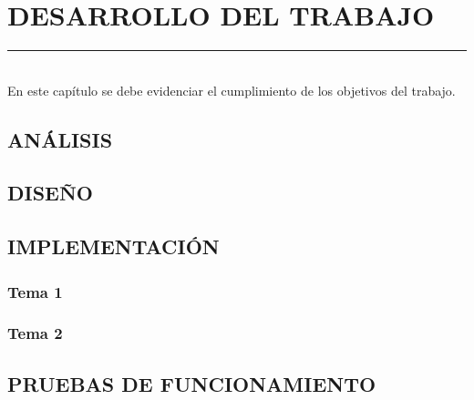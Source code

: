 \section{DESARROLLO DEL TRABAJO}
\rule{\textwidth}{1pt}\\

En este capítulo se debe evidenciar el cumplimiento de los objetivos del trabajo.
\subsection{ANÁLISIS}
\lipsum[1]
\subsection{DISEÑO}
\lipsum[1]
\subsection{IMPLEMENTACIÓN}
\subsubsection{Tema 1}
\lipsum[1]
\subsubsection{Tema 2}
\lipsum[1]
\subsection{PRUEBAS DE FUNCIONAMIENTO}
\lipsum[1]
\newpage